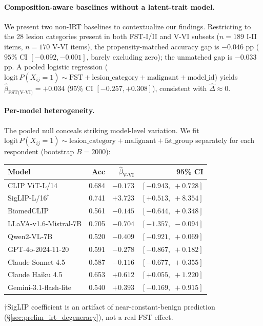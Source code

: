\documentclass{article}
\begin{document}
\paragraph{Composition-aware baselines without a latent-trait model.}
\label{sec:baselines}
We present two non-IRT baselines to contextualize our findings. Restricting to the 28 lesion categories present in both FST-I/II and V-VI subsets ($n = 189$ I-II items, $n = 170$ V-VI items), the propensity-matched accuracy gap is $-0.046$ pp ($95\%$ CI $[-0.092, -0.001]$, barely excluding zero); the unmatched gap is $-0.033$ pp. A pooled logistic regression ($\text{logit}\,P(X_{ij}=1) \sim \text{FST} + \text{lesion\_category} + \text{malignant} + \text{model\_id}$) yields $\hat\beta_{\text{FST(V-VI)}} = +0.034$ ($95\%$ CI $[-0.257, +0.308]$), consistent with $\hat\Delta \approx 0$.

\paragraph{Per-model heterogeneity.}
The pooled null conceals striking model-level variation. We fit $\text{logit}\,P(X_{ij}=1) \sim \text{lesion\_category} + \text{malignant} + \text{fst\_group}$ separately for each respondent (bootstrap $B=2000$):

\begin{center}
\small
\setlength{\tabcolsep}{4pt}
\begin{tabular}{lrrr}
\toprule
Model & Acc & $\hat\beta_{\text{V-VI}}$ & 95\% CI \\
\midrule
CLIP ViT-L/14              & 0.684 & $-0.173$ & $[-0.943,\; +0.728]$ \\
SigLIP-L/16$^\dagger$      & 0.741 & $+3.723$ & $[+0.513,\; +8.354]$ \\
BiomedCLIP                 & 0.561 & $-0.145$ & $[-0.644,\; +0.348]$ \\
LLaVA-v1.6-Mistral-7B      & 0.705 & $-0.704$ & $[-1.357,\; -0.094]$ \\
Qwen2-VL-7B                & 0.520 & $-0.409$ & $[-0.921,\; +0.069]$ \\
GPT-4o-2024-11-20          & 0.591 & $-0.278$ & $[-0.867,\; +0.182]$ \\
Claude Sonnet 4.5          & 0.587 & $-0.116$ & $[-0.677,\; +0.355]$ \\
Claude Haiku 4.5           & 0.653 & $+0.612$ & $[+0.055,\; +1.220]$ \\
Gemini-3.1-flash-lite      & 0.540 & $+0.393$ & $[-0.169,\; +0.915]$ \\
\bottomrule
\end{tabular}

\vspace{0.3ex}
{\footnotesize $\dagger$SigLIP coefficient is an artifact of near-constant-benign prediction (\S\ref{sec:prelim_irt_degeneracy}), not a real FST effect.}
\end{center}
\end{document}
